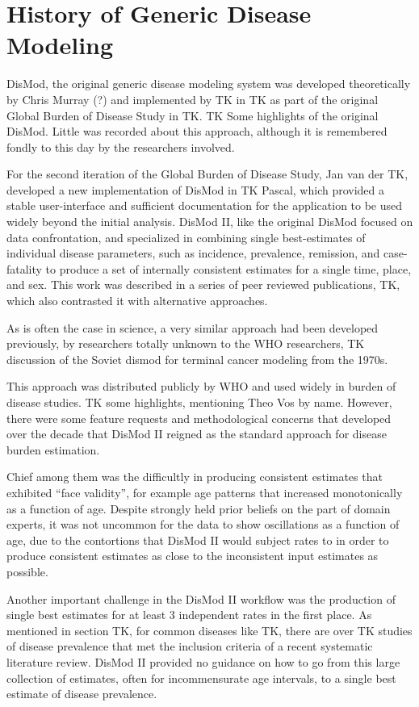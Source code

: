 \section{History of Generic Disease Modeling}

DisMod, the original generic disease modeling system was developed
theoretically by Chris Murray (?) and implemented by TK in TK as part
of the original Global Burden of Disease Study in TK. TK Some
highlights of the original DisMod. Little was recorded about this
approach, although it is remembered fondly to this day by the
researchers involved.

For the second iteration of the Global Burden of Disease Study, Jan
van der TK, developed a new implementation of DisMod in TK Pascal,
which provided a stable user-interface and sufficient documentation
for the application to be used widely beyond the initial analysis.
DisMod II, like the original DisMod focused on data confrontation, and
specialized in combining single best-estimates of individual disease
parameters, such as incidence, prevalence, remission, and
case-fatality to produce a set of internally consistent estimates for
a single time, place, and sex.  This work was described in a series of
peer reviewed publications, TK, which also contrasted it with
alternative approaches.

As is often the case in science, a very similar approach had been
developed previously, by researchers totally unknown to the WHO
researchers, TK discussion of the Soviet dismod for terminal cancer
modeling from the 1970s.

This approach was distributed publicly by WHO and used widely in
burden of disease studies. TK some highlights, mentioning Theo Vos by
name. However, there were some feature requests and methodological
concerns that developed over the decade that DisMod II reigned as the
standard approach for disease burden estimation.

Chief among them was the difficultly in producing consistent estimates
that exhibited ``face validity'', for example age patterns that
increased monotonically as a function of age.  Despite strongly held
prior beliefs on the part of domain experts, it was not uncommon for
the data to show oscillations as a function of age, due to the
contortions that DisMod II would subject rates to in order to produce
consistent estimates as close to the inconsistent input estimates as
possible.

Another important challenge in the DisMod II workflow was the
production of single best estimates for at least 3 independent rates
in the first place.  As mentioned in section TK, for common diseases
like TK, there are over TK studies of disease prevalence that met the
inclusion criteria of a recent systematic literature review. DisMod II
provided no guidance on how to go from this large collection of
estimates, often for incommensurate age intervals, to a single best
estimate of disease prevalence.

